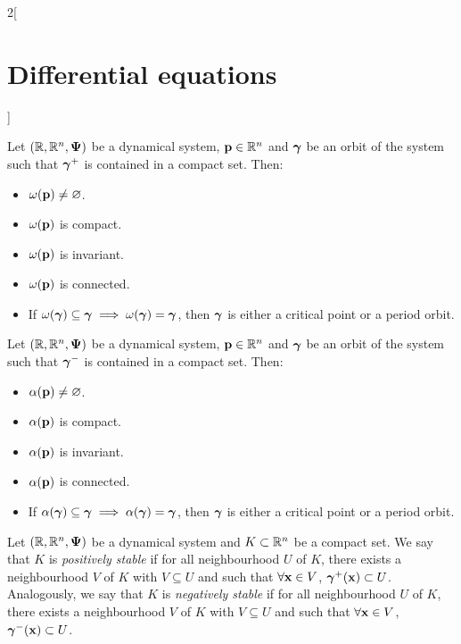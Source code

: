 \documentclass[../../../main.tex]{subfiles}
\begin{document}
\begin{multicols}{2}[\section{Differential equations}]
\begin{definition}
  \end{definition}
  \begin{proposition}
    Let $(\mathbb{R},\mathbb{R}^n,\boldsymbol{\mathrm{\Psi}})$ be a dynamical system, $\boldsymbol{\mathrm{p}}\in \mathbb{R}^n$ and $\boldsymbol{\mathrm{\gamma}}$ be an orbit of the system such that ${\boldsymbol{\mathrm{\gamma}}}^+$ is contained in a compact set. Then:
    \begin{itemize}
      \item $\omega(\boldsymbol{\mathrm{p}})\ne\varnothing$.
      \item $\omega(\boldsymbol{\mathrm{p}})$ is compact.
      \item $\omega(\boldsymbol{\mathrm{p}})$ is invariant.
      \item $\omega(\boldsymbol{\mathrm{p}})$ is connected.
      \item If $\omega(\boldsymbol{\mathrm{\gamma}})\subseteq\boldsymbol{\mathrm{\gamma}}\implies\omega(\boldsymbol{\mathrm{\gamma}})=\boldsymbol{\mathrm{\gamma}}$, then $\boldsymbol{\mathrm{\gamma}}$ is either a critical point or a period orbit.
    \end{itemize}
  \end{proposition}
  \begin{proposition}
    Let $(\mathbb{R},\mathbb{R}^n,\boldsymbol{\mathrm{\Psi}})$ be a dynamical system, $\boldsymbol{\mathrm{p}}\in \mathbb{R}^n$ and $\boldsymbol{\mathrm{\gamma}}$ be an orbit of the system such that ${\boldsymbol{\mathrm{\gamma}}}^-$ is contained in a compact set. Then:
    \begin{itemize}
      \item $\alpha(\boldsymbol{\mathrm{p}})\ne\varnothing$.
      \item $\alpha(\boldsymbol{\mathrm{p}})$ is compact.
      \item $\alpha(\boldsymbol{\mathrm{p}})$ is invariant.
      \item $\alpha(\boldsymbol{\mathrm{p}})$ is connected.
      \item If $\alpha(\boldsymbol{\mathrm{\gamma}})\subseteq\boldsymbol{\mathrm{\gamma}}\implies\alpha(\boldsymbol{\mathrm{\gamma}})=\boldsymbol{\mathrm{\gamma}}$, then $\boldsymbol{\mathrm{\gamma}}$ is either a critical point or a period orbit.
    \end{itemize}
  \end{proposition}
  \begin{definition}
    Let $(\mathbb{R},\mathbb{R}^n,\boldsymbol{\mathrm{\Psi}})$ be a dynamical system and $K\subset \mathbb{R}^n$ be a compact set. We say that $K$ is \emph{positively stable} if for all neighbourhood $U$ of $K$, there exists a neighbourhood $V$ of $K$ with $V\subseteq U$ and such that $\forall \boldsymbol{\mathrm{x}}\in V$, ${\boldsymbol{\mathrm{\gamma}}}^+(\boldsymbol{\mathrm{x}})\subset U$. Analogously, we say that $K$ is \emph{negatively stable} if for all neighbourhood $U$ of $K$, there exists a neighbourhood $V$ of $K$ with $V\subseteq U$ and such that $\forall \boldsymbol{\mathrm{x}}\in V$, ${\boldsymbol{\mathrm{\gamma}}}^-(\boldsymbol{\mathrm{x}})\subset U$.
  \end{definition}

\end{multicols}
\end{document}
